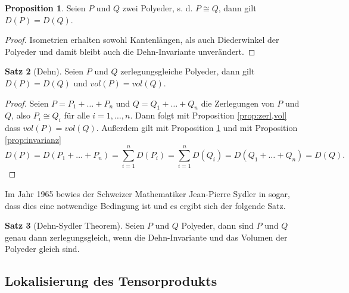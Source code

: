 \documentclass[11pt,titlepage]{article}
\theoremstyle{definition}
\newtheorem{theorem}{Satz}[section]
\newtheorem{proposition}[theorem]{Proposition}
\theoremstyle{remark}
\begin{document}
	\begin{proposition} \label{prop:cong,dehn}
		Seien $P$ und $Q$ zwei Polyeder, s. d. $P\cong Q$, dann gilt $D(P)=D(Q)$.
	\end{proposition}
	
	\begin{proof}
		Isometrien erhalten sowohl Kantenlängen, als auch Diederwinkel der Polyeder und damit bleibt auch 
		die Dehn-Invariante unverändert.
	\end{proof}
	
	\begin{theorem}[Dehn] \label{thm:dehn}
		Seien $P$ und $Q$ zerlegungsgleiche Polyeder, dann gilt $D(P)=D(Q)$ und $vol(P)=vol(Q)$.
	\end{theorem}
	
	\begin{proof}
		Seien $P=P_1+\ldots+P_n$ und $Q=Q_1+\ldots+Q_n$ die Zerlegungen von $P$ und 
		$Q$, also $P_i\cong Q_i$ für alle $i=1,\ldots,n$. Dann folgt mit Proposition \ref{prop:zerl,vol}
		dass $vol(P)=vol(Q)$. Außerdem gilt mit Proposition \ref{prop:cong,dehn}
		und mit Proposition \ref{prop:invarianz}
		\[D(P)=D(P_1+\ldots+P_n)=\sum_{i=1}^n D(P_i) =\sum_{i=1}^n D(Q_i)=D(Q_1+\ldots+Q_n)=D(Q).\]
	\end{proof}
	
	Im Jahr 1965 bewies der Schweizer Mathematiker Jean-Pierre Sydler in 
	\cite{Sydler1965} 
	sogar, dass dies eine notwendige Bedingung ist und 
	es ergibt sich der folgende Satz.
	
	\begin{theorem}[Dehn-Sydler Theorem]
		Seien $P$ und $Q$ Polyeder, dann sind $P$ und $Q$ genau 
		dann zerlegungsgleich, wenn die Dehn-Invariante und das Volumen 
		der Polyeder gleich sind.
	\end{theorem}
	
	\subsection{Lokalisierung des Tensorprodukts}
	
\end{document}
